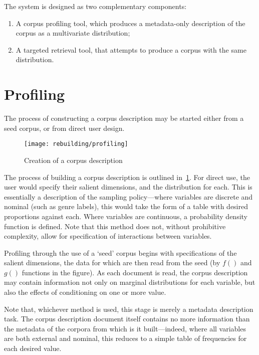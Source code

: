 

The system is designed as two complementary components:

\begin{enumerate}
    \item A corpus profiling tool, which produces a metadata-only description of the corpus as a multivariate distribution;
    \item A targeted retrieval tool, that attempts to produce a corpus with the same distribution.
\end{enumerate}



\section{Profiling}
The process of constructing a corpus description may be started either from a seed corpus, or from direct user design.

\begin{figure}[h]
    \centering
    \texttt{[image: rebuilding/profiling]}
    \caption{Creation of a corpus description}
    \label{fig:rebuilding:profiling}
\end{figure}


The process of building a corpus description is outlined in~\ref{fig:rebuilding:profiling}.  For direct use, the user would specify their salient dimensions, and the distribution for each.  This is essentially a description of the sampling policy---where variables are discrete and nominal (such as genre labels), this would take the form of a table with desired proportions against each.  Where variables are continuous, a probability density function is defined.  Note that this method does not, without prohibitive complexity, allow for specification of interactions between variables.

Profiling through the use of a `seed' corpus begins with specifications of the salient dimensions, the data for which are then read from the seed (by $f()$ and $g()$ functions in the figure).  As each document is read, the corpus description may contain information not only on marginal distributions for each variable, but also the effects of conditioning on one or more value.

Note that, whichever method is used, this stage is merely a metadata description task.  The corpus description document itself contains no more information than the metadata of the corpora from which is it built---indeed, where all variables are both external and nominal, this reduces to a simple table of frequencies for each desired value.  

